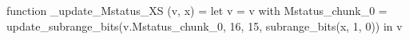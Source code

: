 function _update_Mstatus_XS (v, x) = let v = { v with Mstatus_chunk_0 = update_subrange_bits(v.Mstatus_chunk_0, 16, 15, subrange_bits(x, 1, 0)) } in
  v
